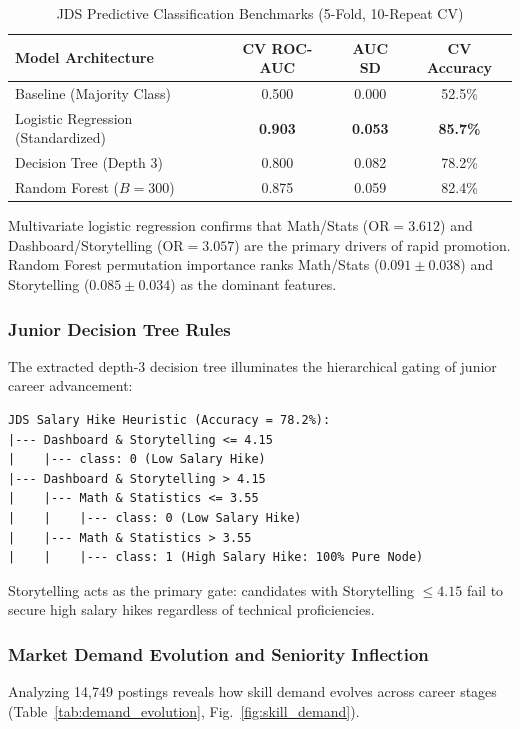 \documentclass[conference]{IEEEtran}
\begin{document}
\begin{table}[!t]
\centering
\caption{JDS Predictive Classification Benchmarks (5-Fold, 10-Repeat CV)}
\label{tab:jds_cv_models}
\footnotesize\begin{tabular}{@{}lccc@{}}
\toprule
\textbf{Model Architecture} & \textbf{CV ROC-AUC} & \textbf{AUC SD} & \textbf{CV Accuracy} \\
\midrule
Baseline (Majority Class) & 0.500 & 0.000 & 52.5\% \\
Logistic Regression (Standardized) & \textbf{0.903} & \textbf{0.053} & \textbf{85.7\%} \\
Decision Tree (Depth 3) & 0.800 & 0.082 & 78.2\% \\
Random Forest ($B=300$) & 0.875 & 0.059 & 82.4\% \\
\bottomrule
\end{tabular}
\end{table}

Multivariate logistic regression confirms that Math/Stats ($\text{OR}=3.612$) and Dashboard/Storytelling ($\text{OR}=3.057$) are the primary drivers of rapid promotion. Random Forest permutation importance ranks Math/Stats ($0.091 \pm 0.038$) and Storytelling ($0.085 \pm 0.034$) as the dominant features.

\subsubsection{Junior Decision Tree Rules}
The extracted depth-3 decision tree illuminates the hierarchical gating of junior career advancement:
\begin{lstlisting}[style=outputstyle]
JDS Salary Hike Heuristic (Accuracy = 78.2%):
|--- Dashboard & Storytelling <= 4.15
|    |--- class: 0 (Low Salary Hike)
|--- Dashboard & Storytelling > 4.15
|    |--- Math & Statistics <= 3.55
|    |    |--- class: 0 (Low Salary Hike)
|    |--- Math & Statistics > 3.55
|    |    |--- class: 1 (High Salary Hike: 100% Pure Node)
\end{lstlisting}
Storytelling acts as the primary gate: candidates with Storytelling $\le 4.15$ fail to secure high salary hikes regardless of technical proficiencies.

\subsubsection{Market Demand Evolution and Seniority Inflection}
Analyzing 14,749 postings reveals how skill demand evolves across career stages (Table~\ref{tab:demand_evolution}, Fig.~\ref{fig:skill_demand}).
\end{document}
